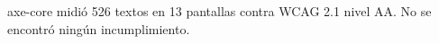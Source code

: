 axe-core midió 526 textos en 13 pantallas contra WCAG 2.1 nivel AA. No se encontró ningún incumplimiento.